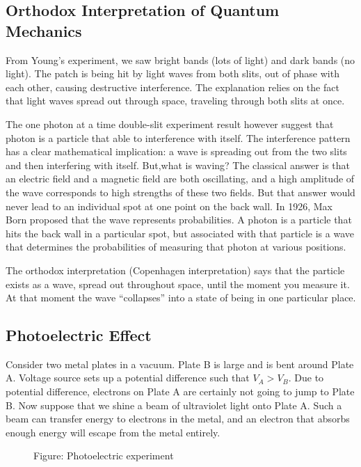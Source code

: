 \documentclass[../../main.tex]{subfiles}
\begin{document}
\subsection{Orthodox Interpretation of Quantum Mechanics}
From Young's experiment, we saw bright bands (lots of light) and dark bands (no light). The patch is being hit by light waves from both slits, out of phase with each other, causing destructive interference. The explanation relies on the fact that light waves spread out through space, traveling through both slits at once. 

The one photon at a time double-slit experiment result however suggest that photon is a particle that able to interference with itself. The interference pattern has a clear mathematical implication: a wave is spreading out from the two slits and then interfering with itself. But,what is waving? The classical answer is that an electric field and a magnetic field are both oscillating, and a high amplitude of the wave corresponds to high strengths of these two fields. But that answer would never lead to an individual spot at one point on the back wall. In 1926, Max Born proposed that the wave represents probabilities. A photon is a particle that hits the back wall in a particular spot, but associated with that particle is a wave that determines the probabilities of measuring that photon at various positions. 

The orthodox interpretation (Copenhagen interpretation) says that the particle exists as a wave, spread out throughout space, until the moment you measure it. At that moment the wave “collapses” into a state of being in one particular place. 

\subsection{Photoelectric Effect}
Consider two metal plates in a vacuum. Plate B is large and is bent around Plate A. Voltage source sets up a potential difference such that $V_A > V_B$. Due to potential difference, electrons on Plate A are certainly not going to jump to Plate B. Now suppose that we shine a beam of ultraviolet light onto Plate A. Such a beam can transfer energy to electrons in the metal, and an electron that absorbs enough energy will escape from the metal entirely. 

\begin{figure}[b]
    \centering
    \caption*{Figure: Photoelectric experiment}
\end{figure}
\end{document}
